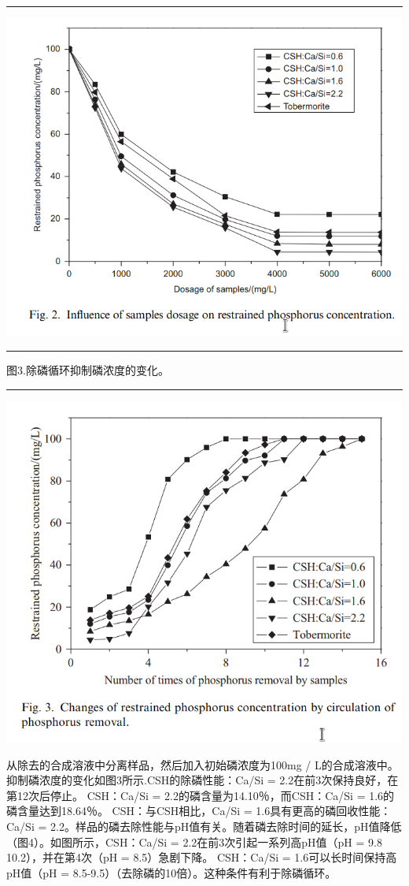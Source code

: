\documentclass[11pt]{article}
\begin{document}
\noindent\rule{\textwidth}{0.5pt}
\includegraphics[scale=0.3]{fig.2.png}

\noindent\rule{\textwidth}{0.5pt}
图3.除磷循环抑制磷浓度的变化。

\noindent\rule{\textwidth}{0.5pt}
\includegraphics[scale=0.5]{fig.3.png}

从除去的合成溶液中分离样品，然后加入初始磷浓度为100mg / L的合成溶液中。抑制磷浓度的变化如图3所示.CSH的除磷性能：Ca/Si = 2.2在前3次保持良好，在第12次后停止。 CSH：Ca/Si = 2.2的磷含量为14.10％，而CSH：Ca/Si = 1.6的磷含量达到18.64％。 CSH：与CSH相比，Ca/Si = 1.6具有更高的磷回收性能：Ca/Si = 2.2。样品的磷去除性能与pH值有关。随着磷去除时间的延长，pH值降低（图4）。如图所示，CSH：Ca/Si = 2.2在前3次引起一系列高pH值（pH = 9.8 10.2），并在第4次（pH = 8.5）急剧下降。 CSH：Ca/Si = 1.6可以长时间保持高pH值（pH = 8.5-9.5）（去除磷的10倍）。这种条件有利于除磷循环。
\end{document}
